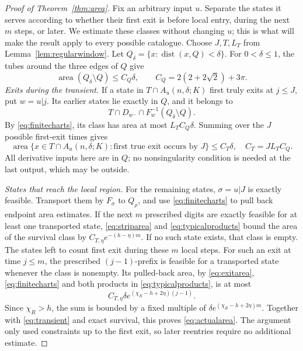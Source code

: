 \documentclass[11pt]{amsart}
\theoremstyle{definition}
\theoremstyle{remark}
\newcommand{\area}{\operatorname{area}}
\newcommand{\dist}{\operatorname{dist}}
\numberwithin{equation}{section}
\begin{document}
\begin{proof}[Proof of Theorem~\ref{thm:area}]
Fix an arbitrary input $u$. Separate the states it serves according
to whether their first exit is before local entry, during the next
$m$ steps, or later. We estimate these classes without changing $u$;
this is what will make the result apply to every possible catalogue.
Choose \(J,T,L_T\) from Lemma~\ref{lem:regularwindow}.
Let \(Q_\delta=\{x:\dist(x,Q)<\delta\}\).
For \(0<\delta\le1\), the tubes around the three edges of \(Q\) give
\[
\area(Q_\delta\setminus Q)\le C_Q\delta,\qquad
C_Q=2(2+2\sqrt2)+3\pi .
\]
\smallskip
\emph{Exits during the transient.}
If a state in \(T\cap A_u(n,\delta;K)\) first truly exits at
\(j\le J\), put \(w=u|j\). Its earlier states lie exactly in \(Q\),
and it belongs to
\[
T\cap D_{w^-}\cap F_w^{-1}(Q_\delta\setminus Q).
\]
By \eqref{eq:finitecharts}, its class has area at most
\(L_TC_Q\delta\). Summing over the \(J\) possible first-exit times
gives
\begin{equation}\label{eq:transient}
\area\{x\in T\cap A_u(n,\delta;K):
             \text{first true exit occurs by }J\}\le C_T\delta,
\quad C_T=JL_TC_Q .
\end{equation}
All derivative inputs here are in \(Q\); no nonsingularity condition
is needed at the last output, which may be outside.

\smallskip
\emph{States that reach the local region.}
For the remaining states, \(\sigma=u|J\) is exactly feasible.
Transport them by \(F_\sigma\) to \(Q_\rho\), and use
\eqref{eq:finitecharts} to pull back endpoint area estimates.
If the next \(m\) prescribed digits are exactly feasible for at
least one transported state, \eqref{eq:striparea} and
\eqref{eq:typicalproducts} bound the area of the survival class by
\(C_{T,\eta}e^{-(h-\eta)m}\). If no such state exists, that class is empty.
The states left to count first exit during these $m$ local steps.
For such an exit at time \(j\le m\), the prescribed
\((j-1)\)-prefix is feasible for a transported state whenever the
class is nonempty. Its pulled-back area, by \eqref{eq:exitarea},
\eqref{eq:finitecharts} and both products in
\eqref{eq:typicalproducts}, is at most
\[
C_{T,\eta}\delta e^{(\chi_R-h+2\eta)(j-1)}.
\]
Since \(\chi_R>h\), the sum is bounded by a fixed multiple of
\(\delta e^{(\chi_R-h+2\eta)m}\). Together with
\eqref{eq:transient} and exact survival, this proves
\eqref{eq:actualarea}. The argument only used constraints up to
the first exit, so later reentries require no additional estimate.
\end{proof}
\end{document}
